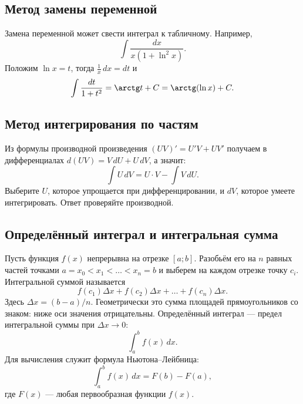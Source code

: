 \subsection*{Метод замены переменной}
Замена переменной может свести интеграл к табличному. Например,
\[
\int\frac{dx}{x(1+\ln^{2}x)}.
\]
Положим $\ln x=t$, тогда $\frac{1}{x}\,dx=dt$ и
\[
\int\frac{dt}{1+t^2}=\arctg t+C=\arctg(\ln x)+C.
\]

\subsection*{Метод интегрирования по частям}
Из формулы производной произведения $(UV)'=U'V+UV'$ получаем в дифференциалах $d(UV)=V\,dU+U\,dV$, а значит:
\[
  \int U\,dV=U\cdot V-\int V\,dU.
\]
Выберите $U$, которое упрощается при дифференцировании, и $dV$, которое умеете интегрировать. Ответ проверяйте производной.

\subsection*{Определённый интеграл и интегральная сумма}
Пусть функция $f(x)$ непрерывна на отрезке $[a;b]$. Разобьём его на $n$ равных частей точками $a=x_0<x_1<\dots<x_n=b$ и выберем на каждом отрезке точку $c_i$. Интегральной суммой называется
\[
f(c_1)\Delta x+f(c_2)\Delta x+\dots+f(c_n)\Delta x.
\]
Здесь $\Delta x=(b-a)/n$. Геометрически это сумма площадей прямоугольников со знаком: ниже оси значения отрицательны. Определённый интеграл --- предел интегральной суммы при $\Delta x\to0$:
\[
\int_a^b f(x)\,dx.
\]
Для вычисления служит формула Ньютона--Лейбница:
\[
\int_a^b f(x)\,dx=F(b)-F(a),
\]
где $F(x)$ --- любая первообразная функции $f(x)$.
